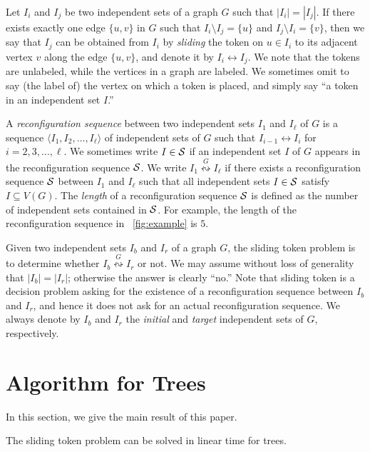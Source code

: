 \documentclass{llncs}
\newcommand{\msize}[1]{{\left|#1\right|}}
\newcommand{\bfI}{I}
\newcommand{\calS}{{\cal S}}
\newcommand{\onestep}{\leftrightarrow}
\newcommand{\sevstep}{\leftrightsquigarrow}
\newcommand{\sevstepT}[1]{\overset{#1}{\sevstep}}
\newcounter{one}
\newcounter{two}
\begin{document}
Let $\bfI_i$ and $\bfI_j$ be two independent sets of a graph $G$ such that $\msize{\bfI_i} = \msize{\bfI_j}$. 
If there exists exactly one edge $\{u,v\}$ in $G$ such that $\bfI_{i} \setminus\bfI_{j}=\{u\}$ 
and $\bfI_{j}\setminus\bfI_{i}=\{v\}$, 
then we say that $\bfI_{j}$ can be obtained from $\bfI_{i}$ by {\em sliding} 
the token on $u \in \bfI_{i}$ to its adjacent vertex $v$ along the edge $\{u,v\}$, 
and denote it by $\bfI_{i} \onestep \bfI_{j}$. 
We note that the tokens are unlabeled, while the vertices in a graph are labeled.
	We sometimes omit to say (the label of) the vertex on which a token is placed, and simply say ``a token in an independent set $\bfI$.''

A {\em reconfiguration sequence} between two independent sets $\bfI_1$ and $\bfI_{\ell}$ of $G$ 
is a sequence $\langle \bfI_1, \bfI_2, \ldots, \bfI_{\ell} \rangle$ of 
independent sets of $G$ such that $\bfI_{i-1} \onestep \bfI_i$ for $i=2, 3, \ldots, \ell$.
We sometimes write $\bfI \in \calS$ if an independent set $\bfI$ of $G$ appears in the reconfiguration sequence $\calS$. 
We write $\bfI_{1} \sevstepT{G} \bfI_{\ell}$ if there exists a reconfiguration sequence $\calS$ between $\bfI_1$ and $\bfI_{\ell}$ such that all independent sets $\bfI \in \calS$ satisfy $\bfI \subseteq V(G)$.
The {\em length} of a reconfiguration sequence $\calS$ is defined as 
the number of independent sets contained in $\calS$.
For example, 
the length of the reconfiguration sequence in \figurename~\ref{fig:example} is $5$. 

Given two independent sets $\bfI_b$ and $\bfI_r$ of a graph $G$, the {\sc sliding token} problem is to determine whether $\bfI_b \sevstepT{G} \bfI_r$ or not.
We may assume without loss of generality that $\msize{\bfI_b} = \msize{\bfI_r}$; 
otherwise the answer is clearly ``no.'' 
Note that {\sc sliding token} is 
a decision problem asking for the existence of a reconfiguration sequence 
between $\bfI_b$ and $\bfI_r$, and hence it does not ask for an actual reconfiguration sequence. 
We always denote by $\bfI_b$ and $\bfI_r$ the {\em initial} and {\em target} independent sets of $G$, 
respectively.



	\section{Algorithm for Trees}
	\label{sec:algorithm}
	
	In this section, we give the main result of this paper. 
	\begin{theorem} \label{the:tree}
	The {\sc sliding token} problem can be solved in linear time for trees. 
	\end{theorem}
	
\end{document}

